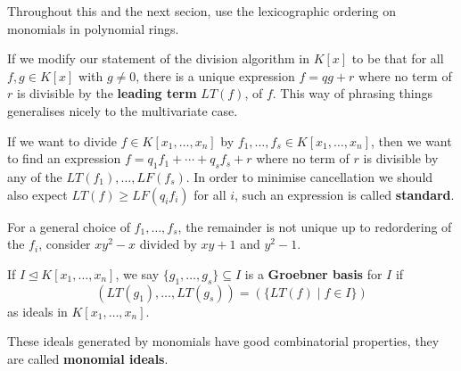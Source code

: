 \documentclass{article}
\begin{document}
Throughout this and the next secion, use the lexicographic ordering on monomials in polynomial rings.

If we modify our statement of the division algorithm in $K[x]$ to be that for all $f,g\in K[x]$ with $g\neq 0$, there is a unique expression $f=qg+r$ where no term of $r$ is divisible by the \textbf{leading term} $LT(f)$, of $f$. This way of phrasing things generalises nicely to the multivariate case.

If we want to divide $f\in K[x_1,\ldots,x_n]$ by $f_1,\ldots,f_s\in K[x_1,\ldots,x_n]$, then we want to find an expression $f=q_1f_1 + \cdots + q_sf_s + r$ where no term of $r$ is divisible by any of the $LT(f_1),\ldots, LF(f_s)$. In order to minimise cancellation we should also expect $LT(f)\geq LF(q_if_i)$ for all $i$, such an expression is called \textbf{standard}.

For a general choice of $f_1,\ldots, f_s$, the remainder is not unique up to redordering of the $f_i$, consider $xy^2-x$ divided by $xy+1$ and $y^2-1$.

\begin{definition}
    If $I\unlhd K[x_1,\ldots,x_n]$, we say $\{g_1,\ldots, g_s\}\subseteq I$ is a \textbf{Groebner basis} for $I$ if \[
    (LT(g_1),\ldots,LT(g_s)) = (\{LT(f) \mid f \in I\})
    \] as ideals in $K[x_1,\ldots,x_n]$.
\end{definition}

These ideals generated by monomials have good combinatorial properties, they are called \textbf{monomial ideals}.
\end{document}
